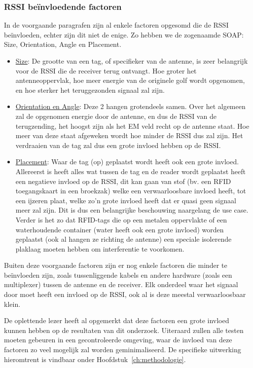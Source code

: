 \subsubsection{RSSI beïnvloedende factoren}
In de voorgaande paragrafen zijn al enkele factoren opgesomd die de RSSI beïnvloeden, echter zijn dit niet de enige. Zo hebben we de zogenaamde SOAP: Size, Orientation, Angle en Placement.
\begin{itemize}
	\item \underline{Size}:
	De grootte van een tag, of specifieker van de antenne, is zeer belangrijk voor de RSSI die de receiver terug ontvangt. Hoe groter het antenneoppervlak, hoe meer energie van de originele golf wordt opgenomen, en hoe sterker het teruggezonden signaal zal zijn.
	\item \underline{Orientation en Angle}:
	Deze 2 hangen grotendeels samen. Over het algemeen zal de opgenomen energie door de antenne, en dus de RSSI van de terugzending, het hoogst zijn als het EM veld recht op de antenne staat. Hoe meer van deze staat afgeweken wordt hoe minder de RSSI dus zal zijn. Het verdraaien van de tag zal dus een grote invloed hebben op de RSSI. 
	\item \underline{Placement}:
	Waar de tag (op) geplaatst wordt heeft ook een grote invloed. Allereerst is heeft alles wat tussen de tag en de reader wordt geplaatst heeft een negatieve invloed op de RSSI, dit kan gaan van stof (bv. een RFID toegangskaart in een broekzak) welke een verwaarloosbare invloed heeft, tot een ijzeren plaat, welke zo'n grote invloed heeft dat er quasi geen signaal meer zal zijn. Dit is dus een belangrijke beschouwing naargelang de use case. Verder is het zo dat RFID-tags die op een metalen oppervlakte of een waterhoudende container (water heeft ook een grote invloed) worden geplaatst (ook al hangen ze richting de antenne) een speciale isolerende plaklaag moeten hebben om interferentie te voorkomen.
\end{itemize}

Buiten deze voorgaande factoren zijn er nog enkele factoren die minder te beïnvloeden zijn, zoals tussenliggende kabels en andere hardware (zoals een multiplexer) tussen de antenne en de receiver. Elk onderdeel waar het signaal door moet heeft een invloed op de RSSI, ook al is deze meestal verwaarloosbaar klein.\autocite{Armstrong2013}

De oplettende lezer heeft al opgemerkt dat deze factoren een grote invloed kunnen hebben op de resultaten van dit onderzoek. Uiteraard zullen alle testen moeten gebeuren in een gecontroleerde omgeving, waar de invloed van deze factoren zo veel mogelijk zal worden geminimaliseerd. De specifieke uitwerking hieromtrent is vindbaar onder Hoofdstuk~\ref{ch:methodologie}.

